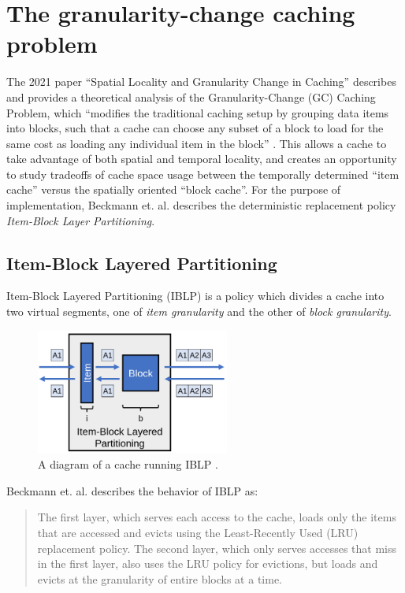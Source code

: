 \documentclass[12pt,twoside]{reedthesis}
\begin{document}
\section{The granularity-change caching problem}
The 2021 paper ``Spatial Locality and Granularity Change in Caching'' describes and provides a theoretical analysis of the Granularity-Change (GC) Caching Problem, which ``modifies the traditional caching setup by grouping data items into blocks, such that a cache can choose any subset of a block to load for the same cost as loading any individual item in the block'' \cite{beckmann}. This allows a cache to take advantage of both spatial and temporal locality, and creates an opportunity to study tradeoffs of cache space usage between the temporally determined ``item cache'' versus the spatially oriented ``block cache''. For the purpose of implementation, Beckmann et. al. describes the deterministic replacement policy \textit{Item-Block Layer Partitioning}.

	\subsection*{Item-Block Layered Partitioning}

	Item-Block Layered Partitioning (IBLP) is a policy which divides a cache into two virtual segments, one of \textit{item granularity} and the other of \textit{block granularity}.

	\begin{figure}[h]
		\centering
		\includegraphics[width=2.5in]{figures/IBLP.png}
		\caption{A diagram of a cache running IBLP \cite{beckmann}.}
	\end{figure}
	
	Beckmann et. al. describes the behavior of IBLP as: \begin{quote}
		The first layer, which serves each access to the cache, loads only the items that are accessed and evicts using the Least-Recently Used (LRU) replacement policy. The second layer, which only serves accesses that miss in the first layer, also uses the LRU policy for evictions, but loads and evicts at the granularity of entire blocks at a time. \cite{beckmann}
	\end{quote}
\end{document}
